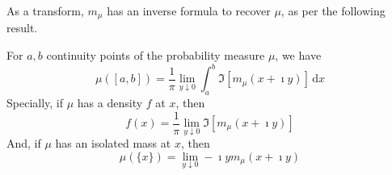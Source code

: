 As a transform, $m_{\mu}$ has an inverse formula to recover $\mu$, as per the following result.

\begin{theorem} \label{thm:inverse-stieltjes-transform}
    For $a,b$ continuity points of the probability measure $\mu$, we have
    \begin{equation}
        \mu\left([a,b]\right)=\frac{1}{\pi}\lim_{y\downarrow 0}\int_{a}^{b}\Im\left[m_{\mu}(x+\imath y)\right]\,\mathrm{d}x
    \end{equation}
    Specially, if $\mu$ has a density $f$ at $x$, then
    \begin{equation}
        f(x)=\frac{1}{\pi}\lim_{y\downarrow 0}\Im\left[m_{\mu}(x+\imath y)\right]
    \end{equation}
    And, if $\mu$ has an isolated mass at $x$, then
    \begin{equation}
        \mu(\{x\})=\lim_{y \downarrow 0}-\imath y m_{\mu}(x+\imath y)
    \end{equation}
\end{theorem}

